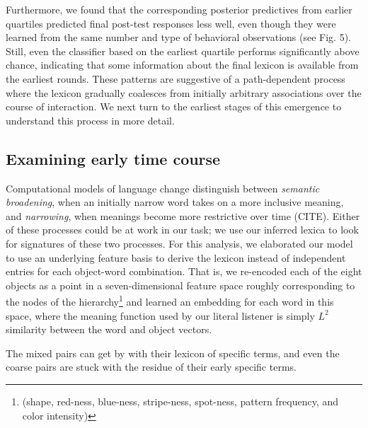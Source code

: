 \documentclass[10pt,letterpaper]{article}
\begin{document}
Furthermore, we found that the corresponding posterior predictives from earlier quartiles predicted final post-test responses less well, even though they were learned from the same number and type of behavioral observations (see Fig. 5). Still, even the classifier based on the earliest quartile performs significantly above chance, indicating that some information about the final lexicon is available from the earliest rounds. These patterns are suggestive of a path-dependent process where the lexicon gradually coalesces from initially arbitrary associations over the course of interaction. We next turn to the earliest stages of this emergence to understand this process in more detail.

\subsection{Examining early time course}

Computational models of language change distinguish between \emph{semantic broadening}, when an initially narrow word takes on a more inclusive meaning, and \emph{narrowing}, when meanings become more restrictive over time (CITE). Either of these processes could be at work in our task; we use our inferred lexica to look for signatures of these two processes. %
For this analysis, we elaborated our model to use an underlying feature basis to derive the lexicon instead of independent entries for each object-word combination. That is, we re-encoded each of the eight objects as a point in a seven-dimensional feature space roughly corresponding to the nodes of the hierarchy\footnote{(shape, red-ness, blue-ness, stripe-ness, spot-ness, pattern frequency, and color intensity)} and learned an embedding for each word in this space, where the meaning function used by our literal listener is simply $L^2$ similarity between the word and object vectors.

The mixed pairs can get by with their lexicon of specific terms, and even the coarse pairs are stuck with the residue of their early specific terms. 

\end{document}
